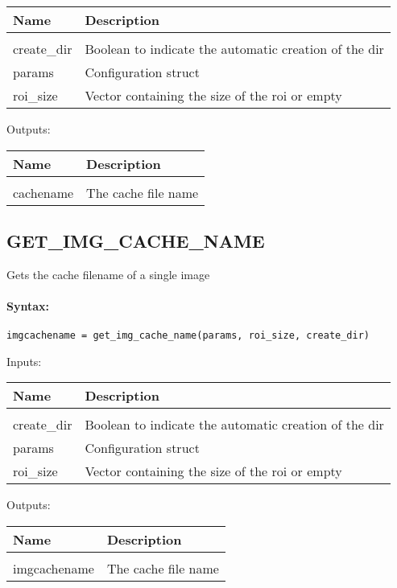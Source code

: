 \begin{tabular}{|l|p{5cm}|}
\hline
\textbf{Name} & \textbf{Description} \\
\hline \hline \\
create\_dir & Boolean to indicate the automatic creation of the dir  \\ \hline
params & Configuration struct  \\ \hline
roi\_size & Vector containing the size of the roi or empty  \\ \hline
\end{tabular}
Outputs:

\begin{tabular}{|l|p{5cm}|}
\hline
\textbf{Name} & \textbf{Description} \\
\hline \hline \\
cachename & The cache file name  \\ \hline
\end{tabular}

\subsection{GET\_IMG\_CACHE\_NAME}

Gets the cache filename of a single image

\paragraph{Syntax:} \verb|imgcachename = get_img_cache_name(params, roi_size, create_dir)|

Inputs:

\begin{tabular}{|l|p{5cm}|}
\hline
\textbf{Name} & \textbf{Description} \\
\hline \hline \\
create\_dir & Boolean to indicate the automatic creation of the dir  \\ \hline
params & Configuration struct  \\ \hline
roi\_size & Vector containing the size of the roi or empty  \\ \hline
\end{tabular}
Outputs:

\begin{tabular}{|l|p{5cm}|}
\hline
\textbf{Name} & \textbf{Description} \\
\hline \hline \\
imgcachename & The cache file name  \\ \hline
\end{tabular}


